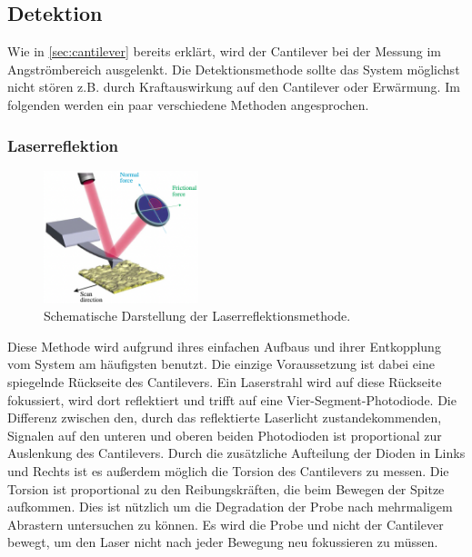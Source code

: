 \subsection{Detektion}
\label{sec:detektion}
    Wie in \autoref{sec:cantilever} bereits erklärt, wird der Cantilever bei der Messung im Angströmbereich ausgelenkt.
    Die Detektionsmethode sollte das System möglichst nicht stören z.B. durch Kraftauswirkung auf den Cantilever oder Erwärmung.
    Im folgenden werden ein paar verschiedene Methoden angesprochen.

    \newpage
    \subsubsection*{Laserreflektion}
        \begin{figure}
            \centering{}
            \includegraphics[width=0.4\textwidth]{bilder/Viersegmentphotodiode.png}
            \caption{Schematische Darstellung der Laserreflektionsmethode.} \vspace*{-0.3cm}
            \label{fig:Viersegmentphotodiode}
        \end{figure}
        \FloatBarrier
        Diese Methode wird aufgrund ihres einfachen Aufbaus und ihrer Entkopplung vom System am häufigsten benutzt.
        Die einzige Voraussetzung ist dabei eine spiegelnde Rückseite des Cantilevers.
        Ein Laserstrahl wird auf diese Rückseite fokussiert, wird dort reflektiert und trifft auf eine Vier-Segment-Photodiode.
        Die Differenz zwischen den, durch das reflektierte Laserlicht zustandekommenden, Signalen auf den unteren und oberen beiden Photodioden ist proportional zur Auslenkung des Cantilevers.
        Durch die zusätzliche Aufteilung der Dioden in Links und Rechts ist es außerdem möglich die Torsion des Cantilevers zu messen.
        Die Torsion ist proportional zu den Reibungskräften, die beim Bewegen der Spitze aufkommen.
        Dies ist nützlich um die Degradation der Probe nach mehrmaligem Abrastern untersuchen zu können.
        Es wird die Probe und nicht der Cantilever bewegt, um den Laser nicht nach jeder Bewegung neu fokussieren zu müssen.

